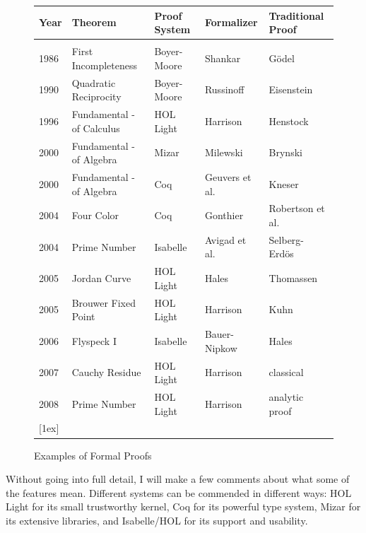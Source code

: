 \documentclass{llncs}
\begin{document}
\begin{figure}[h!]
\centering
\begin{tabular}{l l l l l}
\hline
Year\hspace{0.5em} &Theorem\hspace{8em} &Proof System\hspace{2em}  &Formalizer\hspace{3em} &Traditional Proof\\ [0.5ex]
\hline \\
1986 &First Incompleteness &Boyer-Moore   &Shankar &G\"odel \\
1990 &Quadratic Reciprocity&Boyer-Moore &Russinoff &Eisenstein\\
1996 &Fundamental - of Calculus &HOL Light &Harrison &Henstock\\
2000 &Fundamental - of Algebra &Mizar &Milewski    &Brynski\\ %
2000 &Fundamental - of Algebra &Coq &Geuvers et al.   &Kneser\\
2004 &Four Color &Coq &Gonthier &Robertson et al.\\
2004 &Prime Number &Isabelle &Avigad et al. &Selberg-Erd\"os\\
2005 &Jordan Curve  &HOL Light &Hales &Thomassen \\
2005 &Brouwer Fixed Point &HOL Light &Harrison &Kuhn \\
2006 &Flyspeck I &Isabelle &Bauer-Nipkow &Hales \\
2007 &Cauchy Residue &HOL Light &Harrison &classical \\
2008 &Prime Number &HOL Light &Harrison &analytic proof \\
 [1ex]
\hline
\end{tabular}
\caption{Examples of Formal Proofs}
\label{fig:table}
\end{figure}



Without going into full detail, I will make a few comments about what
some of the features mean.  Different systems can be commended in
different ways: HOL Light for its small trustworthy kernel, Coq for
its powerful type system, Mizar for its extensive libraries, and
Isabelle/HOL for its support and usability.
\end{document}
